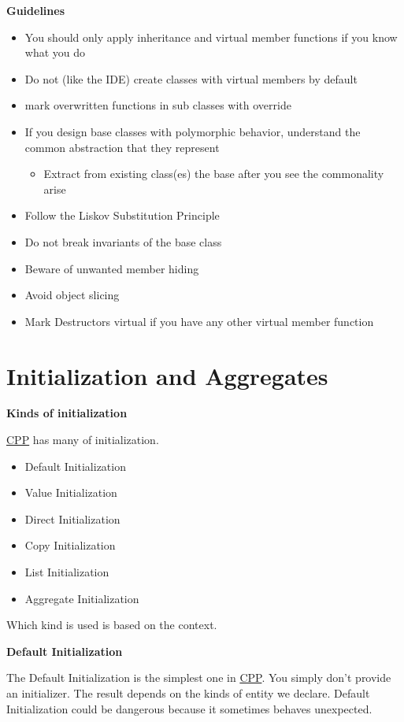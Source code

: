 \documentclass[11pt,twoside,landscape]{article}
\begin{document}
\begin{multicols}{3}
\textbf{Guidelines}

\begin{itemize}
\item You should only apply inheritance and virtual member functions if you know what you do
\item Do not (like the IDE) create classes with virtual members by default
\item mark overwritten functions in sub classes with override
\item If you design base classes with polymorphic behavior, understand the common abstraction that they represent
\begin{itemize}
\item Extract from existing class(es) the base after you see the commonality arise
\end{itemize}
\item Follow the Liskov Substitution Principle
\item Do not break invariants of the base class
\item Beware of unwanted member hiding
\item Avoid object slicing
\item Mark Destructors virtual if you have any other virtual member function
\end{itemize}

\section{Initialization and Aggregates}
\label{sec:orga99287c}
\textbf{Kinds of initialization}

\href{../../../roam/20210920103243-c.org}{CPP} has many of initialization.
\begin{itemize}
\item Default Initialization
\item Value Initialization
\item Direct Initialization
\item Copy Initialization
\item List Initialization
\item Aggregate Initialization
\end{itemize}


Which kind is used is based on the context.

\textbf{Default Initialization}

The Default Initialization is the simplest one in \href{../../../roam/20210920103243-c.org}{CPP}.
You simply don't provide an initializer.
The result depends on the kinds of entity we declare.
Default Initialization could be dangerous because it sometimes behaves unexpected.


\end{multicols}
\end{document}
